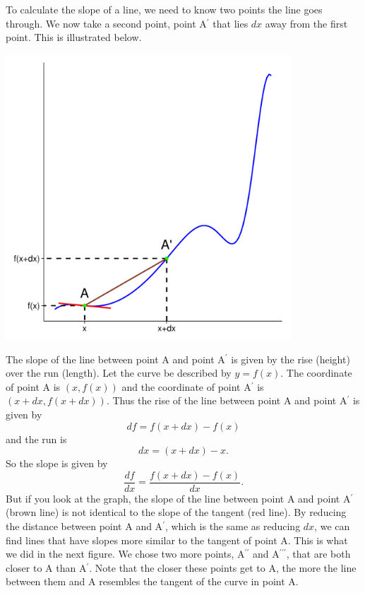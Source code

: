 \documentclass[a4paper]{report}
\begin{document}
To calculate the slope of a line, we need to know two points the line goes through. We now take a second point, point A$^\prime$ \; that lies $dx$ away from the first point. This is illustrated below.\\ 
\begin{center}
\includegraphics[width=0.8\textwidth]{der_graph3.pdf}
\end{center}
The slope of the line between point A and point A$^\prime$ is given by the rise (height) over the run (length). Let the curve be described by $y=f(x)$. The coordinate of point A is $(x, f(x))$ and the coordinate of point A$^\prime$ is $(x+dx, f(x+dx))$. Thus the rise of the line between point A and point A$^\prime$ is given by 
\begin{equation}
df=f(x+dx)-f(x)
\end{equation}
and the run is
\begin{equation}
dx=(x+dx)-x.
\end{equation}
So the slope is given by 
\begin{equation}
\frac{df}{dx}=\frac{f(x+dx)-f(x)}{dx}.
\end{equation}
But if you look at the graph, the slope of the line between point A and point A$^\prime$ (brown line) is not identical to the slope of the tangent (red line). By reducing the distance between point A and A$^\prime$, which is the same as reducing $dx$, we can find lines that have slopes more similar to the tangent of point A. This is what we did in the next figure. We chose two more points, A$^{\prime\prime}$ and A$^{\prime\prime\prime}$, that are both closer to A than A$^\prime$. Note that the closer these points get to A, the more the line between them and A resembles the tangent of the curve in point A.\\
\end{document}
